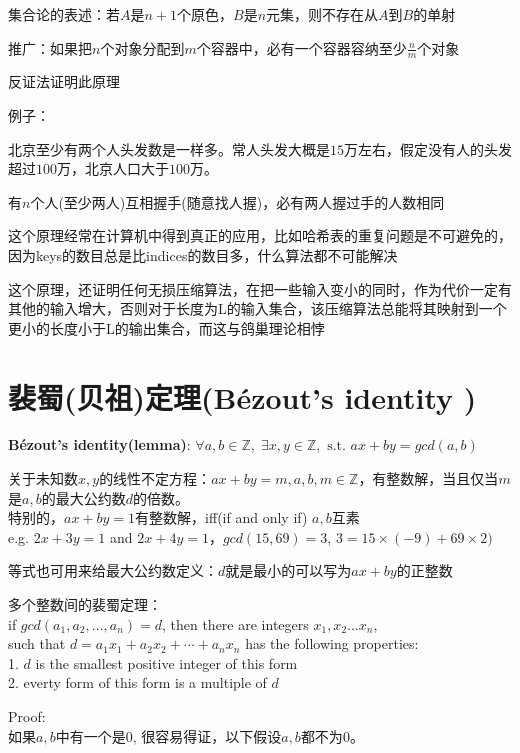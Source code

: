 \documentclass[../main.tex]{subfiles}
\begin{document}
集合论的表述：若$A$是$n+1$个原色，$B$是$n$元集，则不存在从$A$到$B$的单射

推广：如果把$n$个对象分配到$m$个容器中，必有一个容器容纳至少$\frac{n}{m}$个对象

反证法证明此原理

例子：

北京至少有两个人头发数是一样多。常人头发大概是$15$万左右，假定没有人的头发超过$100$万，北京人口大于$100$万。

有$n$个人(至少两人)互相握手(随意找人握)，必有两人握过手的人数相同

这个原理经常在计算机中得到真正的应用，比如哈希表的重复问题是不可避免的，因为keys的数目总是比indices的数目多，什么算法都不可能解决

这个原理，还证明任何无损压缩算法，在把一些输入变小的同时，作为代价一定有其他的输入增大，否则对于长度为L的输入集合，该压缩算法总能将其映射到一个更小的长度小于L的输出集合，而这与鸽巢理论相悖


\section{裴蜀(贝祖)定理(Bézout's identity )}
\begin{mdframed}
  \textbf{Bézout's identity(lemma)}: $\forall a,b \in \mathbb{Z}, \; \exists x, y \in \mathbb{Z}, \text{ s.t. } ax+by=gcd(a,b)$
\end{mdframed}

关于未知数$x,y$的线性不定方程：$ax+by=m, a,b,m \in \mathbb{Z}$，有整数解，当且仅当$m$是$a,b$的最大公约数$d$的倍数。\\
特别的，$ax+by=1$有整数解，iff(if and only if) $a, b$互素\\
e.g. $2x+3y=1$ and $2x+4y=1$，$gcd(15, 69)=3$, $3=15\times (-9) + 69\times 2)$

等式也可用来给最大公约数定义：$d$就是最小的可以写为$ax+by$的正整数

多个整数间的裴蜀定理：\\
if $gcd(a_1, a_2, \ldots , a_n) = d$, then there are integers $x_1, x_2 \ldots  x_n$, \\
such that $d=a_1x_1+a_2x_2+ \cdots +a_nx_n$ has the following properties:\\
1. $d$ is the smallest positive integer of this form\\
2. everty form of this form is a multiple of $d$

Proof:\\
如果$a,b$中有一个是$0$, 很容易得证，以下假设$a, b$都不为$0$。
\end{document}
